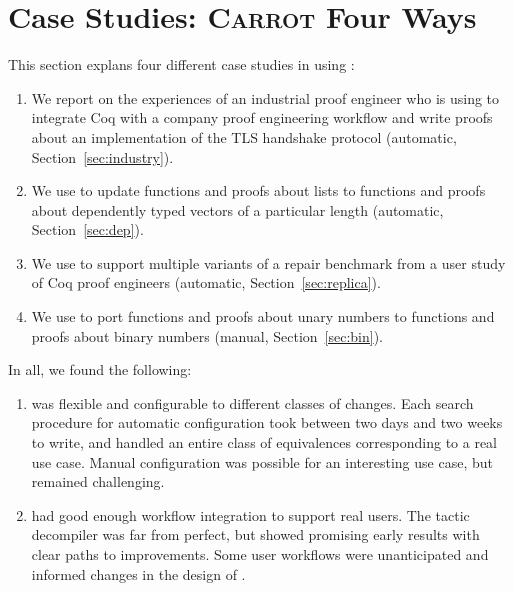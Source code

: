 \section{Case Studies: \textsc{Carrot} Four Ways}
\label{sec:search}

This section explans four different case studies in using \toolname:

\begin{enumerate}
\item We report on the experiences of an industrial proof engineer who is using \toolname to integrate Coq with a company proof engineering workflow and write proofs about an implementation of the TLS handshake protocol (automatic, Section~\ref{sec:industry}).
\item We use \toolname to update functions and proofs about lists to functions and proofs about dependently typed vectors of
a particular length (automatic, Section~\ref{sec:dep}).
\item We use \toolname to support multiple variants of a repair benchmark from a user study of Coq proof engineers (automatic, Section~\ref{sec:replica}).
\item We use \toolname to port functions and proofs about unary numbers to functions and proofs about binary numbers (manual, Section~\ref{sec:bin}).
\end{enumerate}
In all, we found the following:

\begin{enumerate}
\item \toolname was flexible and configurable to different classes of changes. Each search procedure for automatic configuration
took between two days and two weeks to write, and handled an entire class of equivalences corresponding to a real use case.
Manual configuration was possible for an interesting use case, but remained challenging.
\item \toolname had good enough workflow integration to support real users.
The tactic decompiler was far from perfect, but showed promising early results with clear paths to improvements.
Some user workflows were unanticipated and informed changes in the design of \toolname.
\end{enumerate}


